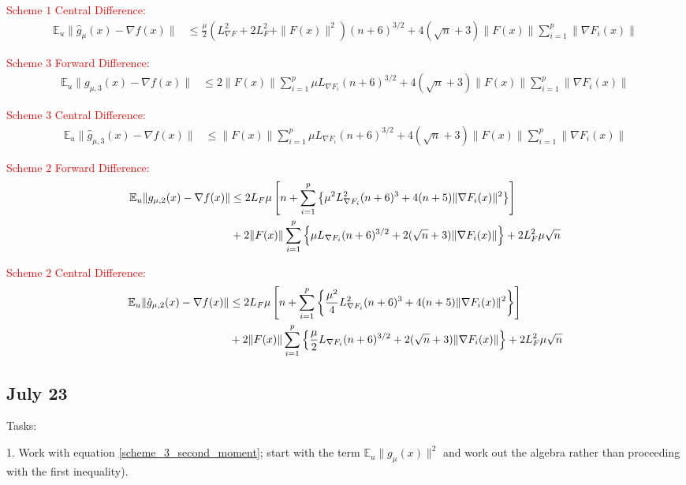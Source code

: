 \documentclass{article}
\begin{document}
\textcolor{red}{Scheme $1$ Central Difference:}
\begin{align}
\mathbb{E}_u\| \hat{g}_{\mu}(x) - \nabla f(x)\| & \leq \frac{\mu}{2}(L_{\nabla F}^2 + 2L_F^2 + \|F(x)\|^2)(n+6)^{3/2} + 4(\sqrt{n}+3)\|F(x)\| \sum_{i=1}^p\|\nabla F_i(x)\|
\end{align}

\textcolor{red}{Scheme $3$ Forward Difference:}
\begin{align}
\mathbb{E}_u\|g_{\mu,3}(x) - \nabla f(x)\| & \leq 2\|F(x)\| \sum_{i=1}^p\mu L_{\nabla F_i}(n+6)^{3/2} + 4(\sqrt{n}+3)\|F(x)\|\sum_{i=1}^p\|\nabla F_i(x)\|
\end{align}

\textcolor{red}{Scheme $3$ Central Difference:}
\begin{align}
\mathbb{E}_u\|\hat{g}_{\mu,3}(x) - \nabla f(x)\| & \leq \|F(x)\|\sum_{i=1}^p\mu L_{\nabla F_i}(n+6)^{3/2} + 4(\sqrt{n}+3)\|F(x)\|\sum_{i=1}^p\| \nabla F_i(x)\|
\end{align}

\textcolor{red}{Scheme $2$ Forward Difference:}
\begin{align}
\mathbb{E}_u\| g_{\mu,2}(x) - \nabla f(x)\| & \leq 2L_F\mu\left[n + \sum_{i=1}^p\left\{\mu^2 L_{\nabla F_i}^2(n+6)^3 + 4(n+5)\| \nabla F_i(x)\|^2\right\}\right] \notag  \\ & + 2\|F(x)\|\sum_{i=1}^p\left\{\mu L_{\nabla F_i}(n+6)^{3/2} + 2(\sqrt{n}+3)\|\nabla F_i(x)\|\right\} + 2L_F^2\mu\sqrt{n}
\end{align}

\textcolor{red}{Scheme $2$ Central Difference:}
\begin{align}
\mathbb{E}_u\| \hat{g}_{\mu,2}(x) - \nabla f(x)\| & \leq 2L_F\mu\left[n + \sum_{i=1}^p\left\{\frac{\mu^2}{4}L_{\nabla F_i}^2(n+6)^3 + 4(n+5)\|\nabla F_i(x)\|^2\right\}\right] \notag \\ & + 2\|F(x)\|\sum_{i=1}^p\left\{\frac{\mu}{2}L_{\nabla F_i}(n+6)^{3/2} + 2(\sqrt{n}+3)\| \nabla F_i(x)\|\right\} + 2L_F^2\mu\sqrt{n}
\end{align}


\subsection{July 23}

Tasks: \newline 

1. Work with equation \eqref{scheme_3_second_moment}; start with the term $\mathbb{E}_u\|g_{\mu}(x)\|^2$ and work out the algebra rather than proceeding with the first inequality). \newline 
\end{document}
